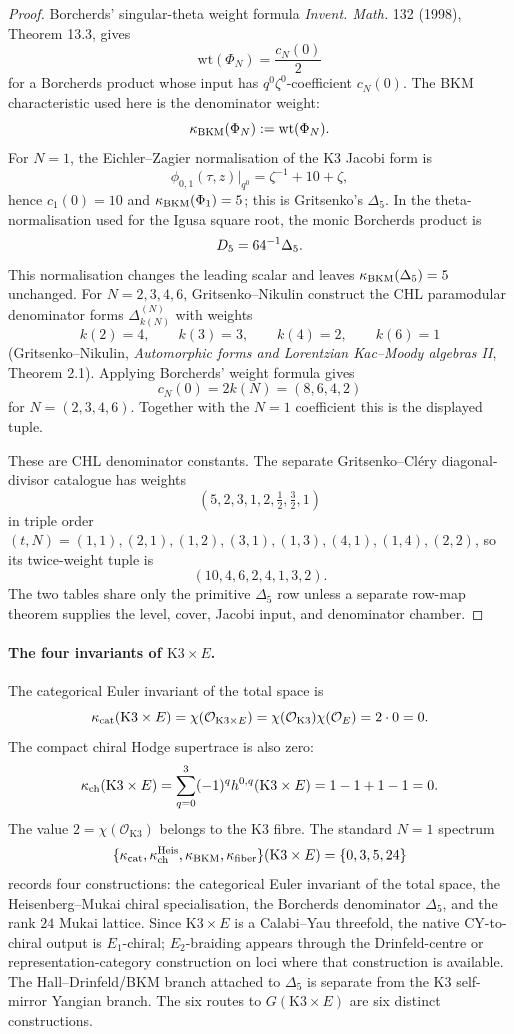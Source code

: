 \begin{proof}
Borcherds' singular-theta weight formula
\emph{Invent. Math.} 132 (1998), Theorem 13.3, gives
\[
  \mathrm{wt}(\Phi_N)=\frac{c_N(0)}{2}
\]
for a Borcherds product whose input has \(q^0\zeta^0\)-coefficient
\(c_N(0)\).  The BKM characteristic used here is the denominator weight:
\[
  \kappa_{\mathrm{BKM}}(\Phi_N):=\mathrm{wt}(\Phi_N).
\]
For \(N=1\), the Eichler--Zagier normalisation of the K3 Jacobi form is
\[
  \phi_{0,1}(\tau,z)\big|_{q^0}=\zeta^{-1}+10+\zeta,
\]
hence \(c_1(0)=10\) and \(\kappa_{\mathrm{BKM}}(\Phi_1)=5\); this is Gritsenko's
\(\Delta_5\).  In the theta-normalisation used for the Igusa square
root, the monic Borcherds product is
\[
  D_5=64^{-1}\Delta_5 .
\]
This normalisation changes the leading scalar and leaves
\(\kappa_{\mathrm{BKM}}(\Delta_5)=5\) unchanged.  For \(N=2,3,4,6\),
Gritsenko--Nikulin construct the CHL
paramodular denominator forms \(\Delta_{k(N)}^{(N)}\) with weights
\[
  k(2)=4,\qquad k(3)=3,\qquad k(4)=2,\qquad k(6)=1
\]
(Gritsenko--Nikulin, \emph{Automorphic forms and Lorentzian
Kac--Moody algebras II}, Theorem 2.1).  Applying Borcherds'
weight formula gives
\[
  c_N(0)=2k(N)=(8,6,4,2)
\]
for \(N=(2,3,4,6)\).  Together with the \(N=1\) coefficient this is the
displayed tuple.

These are CHL denominator constants.  The separate Gritsenko--Cl\'ery
diagonal-divisor catalogue has weights
\[
  (5,2,3,1,2,\tfrac12,\tfrac32,1)
\]
in triple order \((t,N)=(1,1),(2,1),(1,2),(3,1),(1,3),(4,1),(1,4),(2,2)\),
so its twice-weight tuple is
\[
  (10,4,6,2,4,1,3,2).
\]
The two tables share only the primitive \(\Delta_5\) row unless a
separate row-map theorem supplies the level, cover, Jacobi input, and
denominator chamber.
\end{proof}

\paragraph{The four invariants of \(\mathrm{K3}\times E\).}
The categorical Euler invariant of the total space is
\[
  \kappa_{\mathrm{cat}}(\mathrm{K3}\times E)
  =\chi(\mathcal{O}_{\mathrm{K3}\times E})
  =\chi(\mathcal{O}_{\mathrm{K3}})\chi(\mathcal{O}_E)
  =2\cdot 0=0 .
\]
The compact chiral Hodge supertrace is also zero:
\[
  \kappa_{\mathrm{ch}}(\mathrm{K3}\times E)
  =\sum_{q=0}^3(-1)^q h^{0,q}(\mathrm{K3}\times E)
  =1-1+1-1=0 .
\]
The value \(2=\chi(\mathcal{O}_{\mathrm{K3}})\) belongs to the K3 fibre.
The standard \(N=1\) spectrum
\[
  \{\kappa_{\mathrm{cat}},\kappa_{\mathrm{ch}}^{\mathrm{Heis}},\kappa_{\mathrm{BKM}},\kappa_{\mathrm{fiber}}\}(\mathrm{K3}\times E)
  =\{0,3,5,24\}
\]
records four constructions: the categorical Euler invariant of the
total space, the Heisenberg--Mukai chiral specialisation, the Borcherds
denominator \(\Delta_5\), and the rank \(24\) Mukai lattice.  Since
\(\mathrm{K3}\times E\) is a Calabi--Yau threefold, the native
CY-to-chiral output is \(E_1\)-chiral; \(E_2\)-braiding appears through
the Drinfeld-centre or representation-category construction on loci
where that construction is available.  The Hall--Drinfeld/BKM branch
attached to \(\Delta_5\) is separate from the K3 self-mirror Yangian
branch.  The six routes to \(G(\mathrm{K3}\times E)\) are six distinct
constructions.

